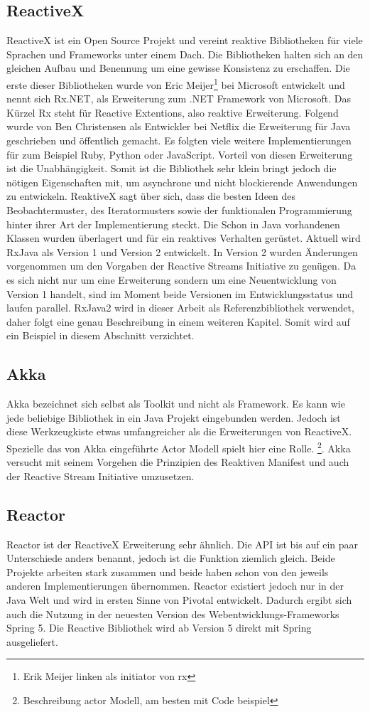 \subsection{ReactiveX}
ReactiveX ist ein Open Source Projekt und vereint reaktive Bibliotheken für viele Sprachen und Frameworks unter einem Dach. Die Bibliotheken halten sich an den gleichen Aufbau und Benennung um eine gewisse Konsistenz zu erschaffen. Die erste dieser Bibliotheken wurde von Eric Meijer\footnote{Erik Meijer linken als initiator von rx} bei Microsoft entwickelt und nennt sich Rx.NET, als Erweiterung zum .NET Framework von Microsoft. Das Kürzel Rx steht für Reactive Extentions, also reaktive Erweiterung. Folgend wurde von Ben Christensen als Entwickler bei Netflix die Erweiterung für Java geschrieben und öffentlich gemacht. Es folgten viele weitere Implementierungen für zum Beispiel Ruby, Python oder JavaScript. Vorteil von diesen Erweiterung ist die Unabhängigkeit. Somit ist die Bibliothek sehr klein bringt jedoch die nötigen Eigenschaften mit, um asynchrone und nicht blockierende Anwendungen zu entwickeln. ReaktiveX sagt über sich, dass die besten Ideen des Beobachtermuster, des Iteratormusters sowie der funktionalen Programmierung hinter ihrer Art der Implementierung steckt. Die Schon in Java vorhandenen Klassen wurden überlagert und für ein reaktives Verhalten gerüstet. Aktuell wird RxJava als Version 1 und Version 2 entwickelt. In Version 2 wurden Änderungen vorgenommen um den Vorgaben der Reactive Streams Initiative zu genügen. Da es sich nicht nur um eine Erweiterung sondern um eine Neuentwicklung von Version 1 handelt, sind im Moment beide Versionen im Entwicklungsstatus und laufen parallel. RxJava2 wird in dieser Arbeit als Referenzbibliothek verwendet, daher folgt eine genau Beschreibung in einem weiteren Kapitel. Somit wird auf ein Beispiel in diesem Abschnitt verzichtet.
\subsection{Akka}
Akka bezeichnet sich selbst als Toolkit und nicht als Framework. Es kann wie jede beliebige Bibliothek in ein Java Projekt eingebunden werden. Jedoch ist diese Werkzeugkiste etwas umfangreicher als die Erweiterungen von ReactiveX. Spezielle das von Akka eingeführte Actor Modell spielt hier eine Rolle. \footnote{Beschreibung actor Modell, am besten mit Code beispiel}. Akka versucht mit seinem Vorgehen die Prinzipien des Reaktiven Manifest und auch der Reactive Stream Initiative umzusetzen.
\subsection{Reactor}
Reactor ist der ReactiveX Erweiterung sehr ähnlich. Die API ist bis auf ein paar Unterschiede anders benannt, jedoch ist die Funktion ziemlich gleich. Beide Projekte arbeiten stark zusammen und beide haben schon von den jeweils anderen Implementierungen übernommen. Reactor existiert jedoch nur in der Java Welt und wird in ersten Sinne von Pivotal entwickelt. Dadurch ergibt sich auch die Nutzung in der neuesten Version des Webentwicklungs-Frameworks Spring 5. Die Reactive Bibliothek wird ab Version 5 direkt mit Spring ausgeliefert.  
